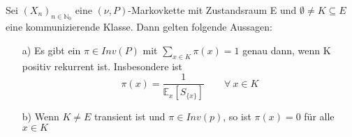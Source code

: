 \label{Satz 3.6}
Sei $(X_{n})_{n \in \mathbb{N}_{0}}$ eine $(\nu,P)$-Markovkette mit Zustandsraum E und $\emptyset \neq K \subseteq E$ eine kommunizierende Klasse. Dann gelten folgende Aussagen:
\begin{itemize}
\item[a)] Es gibt ein $\pi \in Inv(P)$ mit $\sum_{x \in K} \pi(x) = 1$ genau dann, wenn K positiv rekurrent ist. Insbesondere ist
\begin{equation*}
 \pi(x) = \dfrac{1}{\mathbb{E}_{x}[S_{\lbrace x \rbrace}]} \qquad \forall \: x \in K
\end{equation*} 
\item[b)] Wenn $K \neq E$ transient ist und $\pi \in Inv(p)$, so ist $\pi(x) = 0$ für alle $x \in K$ 
\end{itemize}